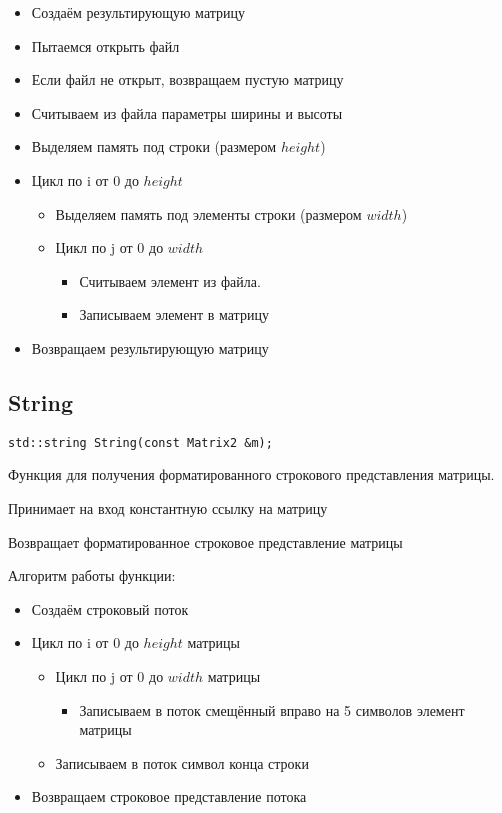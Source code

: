 \documentclass[12pt,a4paper]{article}  %
\begin{document}
	\begin{itemize}
		\item Создаём результирующую матрицу
		\item Пытаемся открыть файл
		\item Если файл не открыт, возвращаем пустую матрицу
		\item Считываем из файла параметры ширины и высоты
		\item Выделяем память под строки (размером $ height $)
		\item Цикл по i от 0 до $ height $
		\begin{itemize}
			\item Выделяем память под элементы строки (размером $ width $)
			\item Цикл по j от 0 до $ width $
			\begin{itemize}
				\item Считываем элемент из файла.
				\item Записываем элемент в матрицу
			\end{itemize}
		\end{itemize}
		\item Возвращаем результирующую матрицу
	\end{itemize}

	\subsection*{String}

	\begin{lstlisting}[label={lst:String}]
		std::string String(const Matrix2 &m);
	\end{lstlisting}

	Функция для получения форматированного строкового представления матрицы.

	Принимает на вход константную ссылку на матрицу

	Возвращает форматированное строковое представление матрицы

	Алгоритм работы функции:

	\begin{itemize}
		\item Создаём строковый поток
		\item Цикл по i от 0 до $ height $ матрицы
		\begin{itemize}
			\item Цикл по j от 0 до $ width $ матрицы
			\begin{itemize}
				\item Записываем в поток смещённый вправо на 5 символов элемент матрицы
			\end{itemize}
			\item Записываем в поток символ конца строки
		\end{itemize}
		\item Возвращаем строковое представление потока
	\end{itemize}
\end{document}
